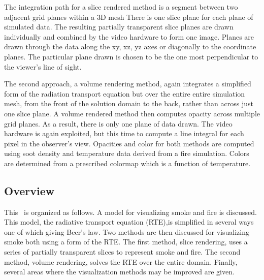 The integration path for a slice rendered method is a segment between two adjacent grid planes within a 3D mesh
There is one slice plane for each plane of simulated data.
The resulting partially transparent slice planes are drawn individually and
combined by the video hardware to form one image. Planes are drawn through the data along the xy, xz, yz axes or diagonally to the coordinate planes.  The particular plane drawn is chosen to be the one most perpendicular to the viewer's line of sight.

The second approach, a volume rendering method, again integrates a
simplified form of the radiation transport equation but over the entire entire simulation mesh,
from the
front of the solution domain to the back, rather than across just
one slice plane. A volume rendered method then computes opacity across multiple grid planes.
As a result, there is only one plane of data drawn.  The video hardware is again exploited, but this time to
compute a line integral for each pixel in the observer's view.  Opacities and
color for both methods are computed using soot density and
temperature data derived from a fire simulation. Colors are
determined from a prescribed colormap which is a function of
temperature.

\subsection{Overview}
This \paper\ is organized as follows.  A model for visualizing smoke and fire is discussed.  This model, the radiative transport equation (RTE),is simplified in several ways one of which giving Beer's law.  
Two methods are then discussed for visualizing smoke  both using a form of the RTE.  The first method, slice rendering,  uses a series of partially transparent slices to represent smoke and fire. The second method, volume rendering, solves the RTE over the entire domain. Finally, several areas where the visualization methods may be improved are given.





%
%

